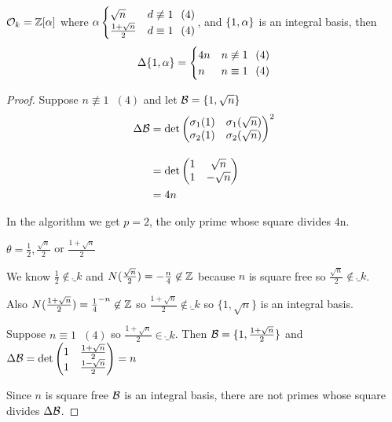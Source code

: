 \documentclass[11pt]{article}
\begin{document}
\begin{theorem}
	$\mathcal{O}_k = \mathbb{Z}[\alpha] $ where $\alpha \begin{cases}
		\sqrt{n} & d \not \equiv 1\hspace{7pt} (4)\\
		\frac{1+\sqrt{n}}2 & d \equiv 1 \hspace{7pt} (4)
	\end{cases}$, and $\{1, \alpha \}$ is an integral basis, then
	\begin{align*}
		\Delta\{1,\alpha\} = \begin{cases}
			4n & n \not \equiv 1 \hspace{7pt} (4)\\
			n & n \equiv 1 \hspace{7pt} (4)\\ 
		\end{cases}
	\end{align*}
\end{theorem}
\begin{proof}
	Suppose $n \not \equiv 1 \hspace{7pt} (4) $ and let $\mathcal{B}  =\{1, \sqrt{n} \}$
	\begin{align*}
		\Delta \mathcal{B} &= \det  \begin{pmatrix}
			\sigma_1(1) & \sigma_1(\sqrt{n})\\
			\sigma_2(1) & \sigma_2(\sqrt{n})
		\end{pmatrix}^2
		\\[1em]
		&= \det \begin{pmatrix}
			1 & \sqrt{n}\\
			1 & -\sqrt{n}
		\end{pmatrix}\\
		&= 4n
	\end{align*}

	In the algorithm we get $p=2$, the only prime whose square divides 4n. 
\spa

	$\theta = \frac{1}{2}, \frac{\sqrt{n}}{2} $ or $\frac{1+\sqrt{n}}{2}$ 
\spa

	We know $ \frac{1}{2} \not \in \ring_k$ and $N(\frac{\sqrt{n}}{2}) = -\frac{n}{4} \not \in \mathbb{Z}$ because $n$ is square free so $\frac{\sqrt{n}}{2} \not \in \ring_k $.
\spa

	Also $N(\frac{1+\sqrt{n}}{2}) = \frac{1}{4}^{-n} \not \in \mathbb{Z}$ so $ \frac{1+\sqrt{n}}{2} \not \in \ring_k $ so $\{1, \sqrt{n} \}$ is an integral basis.
	\spa

	Suppose  $n \equiv 1 \hspace{7pt} (4) $ so $\frac{1+\sqrt{n}}{2} \in \ring_k$. Then $\mathcal{B} = \{1, \frac{1+\sqrt{n}}{2} \}$ and $\Delta \mathcal{B} = \det \begin{pmatrix}
		1 & \frac{1+\sqrt{n}}2\\
		1 & \frac{1-\sqrt{n}}2
	\end{pmatrix}= n$ 
\spa

Since $n$ is square free $\mathcal{B} $ is an integral basis, there are not primes whose square divides $\Delta \mathcal{B} $.


\end{proof}
\end{document}
